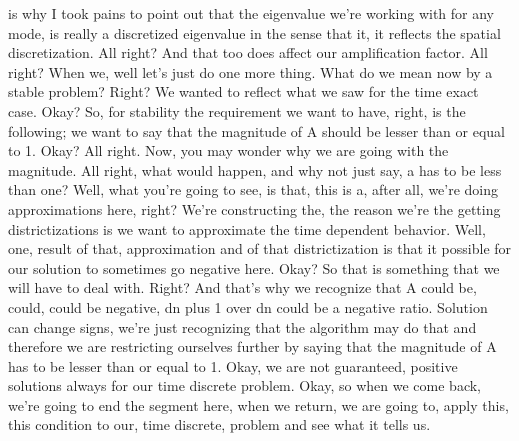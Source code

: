 \documentclass[10pt]{article}
\begin{document}
is why I took pains to point out that the eigenvalue we're working with for any mode, is really a discretized eigenvalue in the sense that it, it reflects the spatial discretization. All right? And that too does affect our amplification factor. All right? When we, well let's just do one more thing. What do we mean now by a stable problem? Right? We wanted to reflect what we saw for the time exact case. Okay? So, for stability the requirement we want to have, right, is the following; we want to say that the magnitude of A should be lesser than or equal to 1. Okay? All right. Now, you may wonder why we are going with the magnitude. All right, what would happen, and why not just say, a has to be less than one? Well, what you're going to see, is that, this is a, after all, we're doing approximations here, right? We're constructing the, the reason we're the getting districtizations is we want to approximate the time dependent behavior. Well, one, result of that, approximation and of that districtization is that it possible for our solution to sometimes go negative here. Okay? So that is something that we will have to deal with. Right? And that's why we recognize that A could be, could, could be negative, dn plus 1 over dn could be a negative ratio. Solution can change signs, we're just recognizing that the algorithm may do that and therefore we are restricting ourselves further by saying that the magnitude of A has to be lesser than or equal to 1. Okay, we are not guaranteed, positive solutions always for our time discrete problem. Okay, so when we come back, we're going to end the segment here, when we return, we are going to, apply this, this condition to our, time discrete, problem and see what it tells us.
\end{document}
